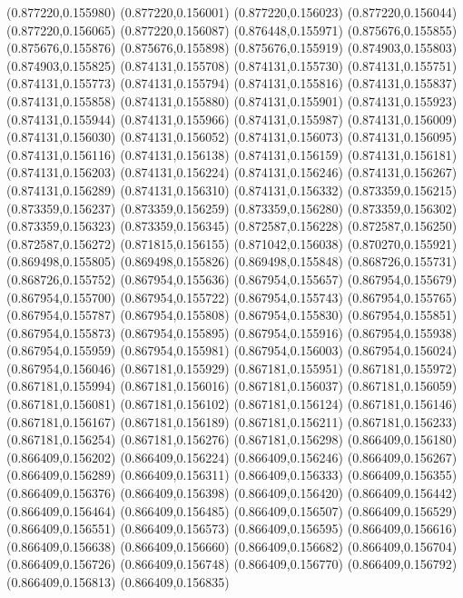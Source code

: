 (0.877220,0.155980)
(0.877220,0.156001)
(0.877220,0.156023)
(0.877220,0.156044)
(0.877220,0.156065)
(0.877220,0.156087)
(0.876448,0.155971)
(0.875676,0.155855)
(0.875676,0.155876)
(0.875676,0.155898)
(0.875676,0.155919)
(0.874903,0.155803)
(0.874903,0.155825)
(0.874131,0.155708)
(0.874131,0.155730)
(0.874131,0.155751)
(0.874131,0.155773)
(0.874131,0.155794)
(0.874131,0.155816)
(0.874131,0.155837)
(0.874131,0.155858)
(0.874131,0.155880)
(0.874131,0.155901)
(0.874131,0.155923)
(0.874131,0.155944)
(0.874131,0.155966)
(0.874131,0.155987)
(0.874131,0.156009)
(0.874131,0.156030)
(0.874131,0.156052)
(0.874131,0.156073)
(0.874131,0.156095)
(0.874131,0.156116)
(0.874131,0.156138)
(0.874131,0.156159)
(0.874131,0.156181)
(0.874131,0.156203)
(0.874131,0.156224)
(0.874131,0.156246)
(0.874131,0.156267)
(0.874131,0.156289)
(0.874131,0.156310)
(0.874131,0.156332)
(0.873359,0.156215)
(0.873359,0.156237)
(0.873359,0.156259)
(0.873359,0.156280)
(0.873359,0.156302)
(0.873359,0.156323)
(0.873359,0.156345)
(0.872587,0.156228)
(0.872587,0.156250)
(0.872587,0.156272)
(0.871815,0.156155)
(0.871042,0.156038)
(0.870270,0.155921)
(0.869498,0.155805)
(0.869498,0.155826)
(0.869498,0.155848)
(0.868726,0.155731)
(0.868726,0.155752)
(0.867954,0.155636)
(0.867954,0.155657)
(0.867954,0.155679)
(0.867954,0.155700)
(0.867954,0.155722)
(0.867954,0.155743)
(0.867954,0.155765)
(0.867954,0.155787)
(0.867954,0.155808)
(0.867954,0.155830)
(0.867954,0.155851)
(0.867954,0.155873)
(0.867954,0.155895)
(0.867954,0.155916)
(0.867954,0.155938)
(0.867954,0.155959)
(0.867954,0.155981)
(0.867954,0.156003)
(0.867954,0.156024)
(0.867954,0.156046)
(0.867181,0.155929)
(0.867181,0.155951)
(0.867181,0.155972)
(0.867181,0.155994)
(0.867181,0.156016)
(0.867181,0.156037)
(0.867181,0.156059)
(0.867181,0.156081)
(0.867181,0.156102)
(0.867181,0.156124)
(0.867181,0.156146)
(0.867181,0.156167)
(0.867181,0.156189)
(0.867181,0.156211)
(0.867181,0.156233)
(0.867181,0.156254)
(0.867181,0.156276)
(0.867181,0.156298)
(0.866409,0.156180)
(0.866409,0.156202)
(0.866409,0.156224)
(0.866409,0.156246)
(0.866409,0.156267)
(0.866409,0.156289)
(0.866409,0.156311)
(0.866409,0.156333)
(0.866409,0.156355)
(0.866409,0.156376)
(0.866409,0.156398)
(0.866409,0.156420)
(0.866409,0.156442)
(0.866409,0.156464)
(0.866409,0.156485)
(0.866409,0.156507)
(0.866409,0.156529)
(0.866409,0.156551)
(0.866409,0.156573)
(0.866409,0.156595)
(0.866409,0.156616)
(0.866409,0.156638)
(0.866409,0.156660)
(0.866409,0.156682)
(0.866409,0.156704)
(0.866409,0.156726)
(0.866409,0.156748)
(0.866409,0.156770)
(0.866409,0.156792)
(0.866409,0.156813)
(0.866409,0.156835)
